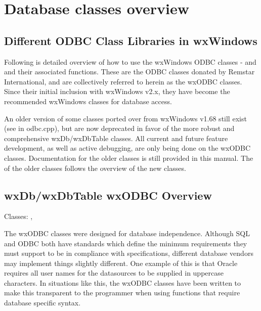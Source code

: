 \section{Database classes overview}\label{odbcoverview}


\subsection{Different ODBC Class Libraries in wxWindows}

Following is detailed overview of how to use the wxWindows ODBC classes -  
and  and their associated functions.  These are 
the ODBC classes donated by Remstar International, and are collectively 
referred to herein as the wxODBC classes.  Since their initial inclusion with 
wxWindows v2.x, they have become the recommended wxWindows classes for database 
access.

An older version of some classes ported over from wxWindows v1.68 still exist 
(see  in odbc.cpp), but are now deprecated in favor of the more 
robust and comprehensive wxDb/wxDbTable classes.  All current and future 
feature development, as well as active debugging, are only being done on 
the wxODBC classes.  Documentation for the older classes is still provided 
in this manual.  The  of the 
older classes follows the overview of the new classes.

\subsection{wxDb/wxDbTable wxODBC Overview}\label{wxodbcoverview}

Classes: , 

The wxODBC classes were designed for database independence.  Although SQL and 
ODBC both have standards which define the minimum requirements they must 
support to be in compliance with specifications, different database vendors 
may implement things slightly different.  One example of this is that Oracle 
requires all user names for the datasources to be supplied in uppercase 
characters.  In situations like this, the wxODBC classes have been written 
to make this transparent to the programmer when using functions that require 
database specific syntax.

